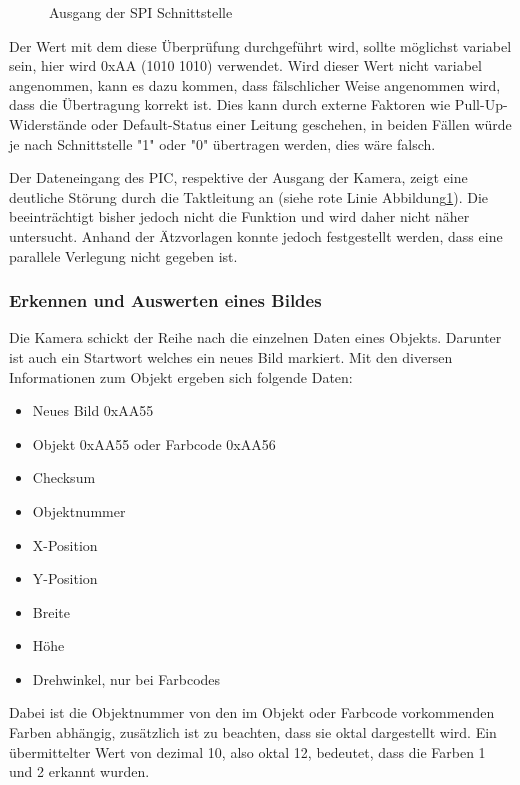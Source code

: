    \begin{figure}[tbh]
      \begin{centering}
      \par\end{centering}
      \caption{Ausgang der SPI Schnittstelle}
      \label{SPI-Ausgang}
    \end{figure}

    Der Wert mit dem diese Überprüfung durchgeführt wird, sollte möglichst variabel sein, hier wird 0xAA (1010 1010) verwendet.
    Wird dieser Wert nicht variabel angenommen, kann es dazu kommen, dass fälschlicher Weise angenommen wird, dass die Übertragung korrekt ist. Dies kann durch externe Faktoren wie
    Pull-Up-Widerstände oder Default-Status einer Leitung geschehen, in beiden Fällen würde je nach Schnittstelle "1" oder "0" übertragen werden, dies wäre falsch.

    Der Dateneingang des PIC, respektive der Ausgang der Kamera, zeigt eine deutliche Störung durch die Taktleitung an (siehe rote Linie Abbildung\ref{SPI-Ausgang}).
    Die beeinträchtigt bisher jedoch nicht die Funktion und wird daher nicht näher untersucht. Anhand der Ätzvorlagen konnte jedoch festgestellt werden, dass eine
    parallele Verlegung nicht gegeben ist.

    \subsubsection{Erkennen und Auswerten eines Bildes}
    Die Kamera schickt der Reihe nach die einzelnen Daten eines Objekts. Darunter ist auch ein Startwort welches ein neues Bild markiert.
    Mit den diversen Informationen zum Objekt ergeben sich folgende Daten:
    \begin{itemize}
      \item Neues Bild 0xAA55
      \item Objekt 0xAA55 oder Farbcode 0xAA56
      \item Checksum
      \item Objektnummer
      \item X-Position
      \item Y-Position
      \item Breite
      \item Höhe
      \item Drehwinkel, nur bei Farbcodes
    \end{itemize}
    Dabei ist die Objektnummer von den im Objekt oder Farbcode vorkommenden Farben abhängig, zusätzlich ist zu beachten, dass sie oktal dargestellt wird.
    Ein übermittelter Wert von dezimal 10, also oktal 12, bedeutet, dass die Farben 1 und 2 erkannt wurden.

